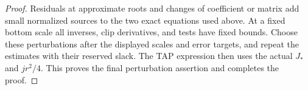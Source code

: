 \begin{proof}
Residuals at approximate roots and changes of coefficient or matrix add small
normalized sources to the two exact equations used above. At a fixed bottom
scale all inverses, clip derivatives, and tests have fixed bounds. Choose
these perturbations after the displayed scales and error targets, and repeat
the estimates with their reserved slack. The TAP expression then uses the
actual $J_*$ and $jr^2/4$. This proves the final perturbation assertion and
completes the proof. \end{proof}
